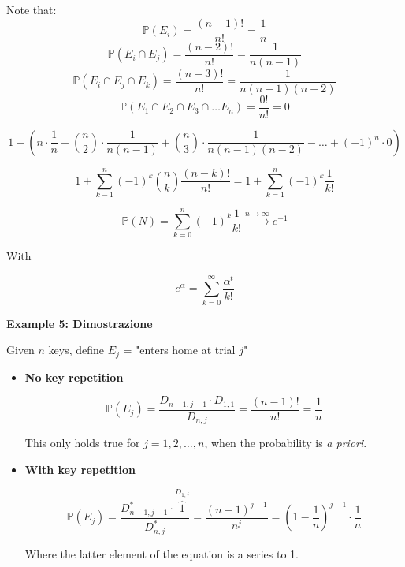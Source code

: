             Note that:
            \[\mathbb{P} (E_i) = \frac{(n-1)!}{n!} = \frac{1}{n} \]
            \[\mathbb{P} (E_i \cap E_j) = \frac{(n-2)!}{n!} = \frac{1}{n(n-1)} \]
            \[\mathbb{P} (E_i \cap E_j \cap E_k) = \frac{(n-3)!}{n!} = \frac{1}{n(n-1)(n-2)} \]
            \[\mathbb{P} (E_1 \cap E_2 \cap E_3 \cap \ldots E_n) = \frac{0!}{n!} = 0 \]

            \begin{equation}
                1 - \left( n \cdot \frac{1}{n} - \binom{n}{2} \cdot \frac{1}{n(n-1)} + \binom{n}{3} \cdot \frac{1}{n(n-1)(n-2)} - \ldots + (-1)^n \cdot 0 \right)
            \end{equation}

            \begin{equation}
                1+ \sum_{k-1}^{n} (-1)^k \binom{n}{k} \frac{(n-k)!}{n!} = 1 + \sum_{k=1}^{n} (-1)^k \frac{1}{k!}
            \end{equation}

            \begin{equation}
                \mathbb{P} (N) = \sum_{k=0}^{n} (-1)^k \frac{1}{k!} \xrightarrow{n \to \infty} e^{-1}
            \end{equation}

            With 

            \[ e^{\alpha} = \sum_{k=0}^{\infty} \frac{\alpha^t}{k!} \]

\textbf{Example 5: Dimostrazione} 

            Given \(n\) keys, define \(E_j\) = "enters home at trial \(j\)"

                \begin{itemize}
                    \item \textbf{No key repetition}
                    
                        \begin{equation}
                            \mathbb{P} (E_j) = \frac{D_{n-1,j-1} \cdot D_{1,1} }{D_{n,j}} = \frac{(n-1)!}{n!} = \frac{1}{n} 
                        \end{equation}

                        This only holds true for \(j = 1,2, \ldots, n\), when the probability is \textit{a priori}.
                    
                    \item \textbf{With key repetition}
                    
                        \begin{equation}
                            \mathbb{P} (E_j) = \frac{D_{n-1,j-1}^* \cdot \overbrace{1}^{D_{1,j}}}{D^*_{n,j}} = \frac{(n-1)^{j-1}}{n^j} = \left( 1 - \frac{1}{n} \right)^{j-1} \cdot \frac{1}{n}
                        \end{equation}

                        Where the latter element of the equation is a series to 1.
                    
                \end{itemize}


